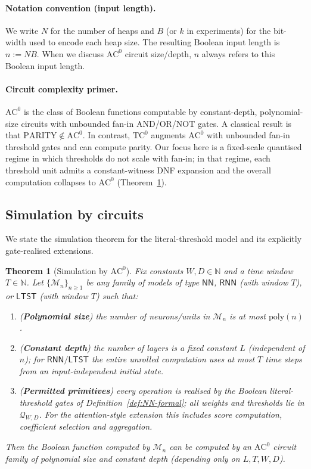 \documentclass[11pt]{article}
\newcommand{\AC}{\mathrm{AC}}
\newcommand{\TC}{\mathrm{TC}}
\newcommand{\poly}{\mathrm{poly}}
\newcommand{\NN}{\mathsf{NN}}
\newcommand{\RNN}{\mathsf{RNN}}
\newcommand{\LTST}{\mathsf{LTST}}
\newcommand{\N}{\mathbb{N}}
\newcommand{\Qset}{\mathcal{Q}}
\theoremstyle{plain}
\newtheorem{theorem}{Theorem}[section]
\theoremstyle{definition}
\theoremstyle{remark}
\numberwithin{equation}{section}
\begin{document}
\paragraph{Notation convention (input length).}
We write $N$ for the number of heaps and $B$ (or $k$ in experiments) for the bit-width used to encode each heap size. The resulting Boolean input length is $n := NB$. When we discuss $\AC^0$ circuit size/depth, $n$ always refers to this Boolean input length.

\paragraph{Circuit complexity primer.}
$\AC^0$ is the class of Boolean functions computable by constant-depth, polynomial-size circuits with unbounded fan-in AND/OR/NOT gates. A classical result is that $\mathrm{PARITY}\notin\AC^0$. In contrast, $\TC^0$ augments $\AC^0$ with unbounded fan-in threshold gates and can compute parity. Our focus here is a fixed-scale quantised regime in which thresholds do not scale with fan-in; in that regime, each threshold unit admits a constant-witness DNF expansion and the overall computation collapses to $\AC^0$ (Theorem~\ref{thm:sim-ac0}).

\subsection{Simulation by circuits}
\label{sec:simulation}

We state the simulation theorem for the literal-threshold model and its explicitly gate-realised extensions.

\begin{theorem}[Simulation by $\AC^0$]
\label{thm:sim-ac0}
Fix constants $W,D\in\N$ and a time window $T\in\N$.
Let $\{\mathcal{M}_n\}_{n\ge 1}$ be any family of models of type $\NN$, $\RNN$ (with window $T$), or $\LTST$ (with window $T$) such that:
\begin{enumerate}[leftmargin=*,label=(\arabic*)]
\item (\textbf{Polynomial size}) the number of neurons/units in $\mathcal{M}_n$ is at most $\poly(n)$.
\item (\textbf{Constant depth}) the number of layers is a fixed constant $L$ (independent of $n$); for $\RNN/\LTST$ the entire unrolled computation uses at most $T$ time steps from an input-independent initial state.
\item (\textbf{Permitted primitives}) every operation is realised by the Boolean literal-threshold gates of Definition~\ref{def:NN-formal}; all weights and thresholds lie in $\Qset_{W,D}$. For the attention-style extension this includes score computation, coefficient selection and aggregation.
\end{enumerate}
Then the Boolean function computed by $\mathcal{M}_n$ can be computed by an $\AC^0$ circuit family of polynomial size and constant depth (depending only on $L,T,W,D$).
\end{theorem}
\end{document}
